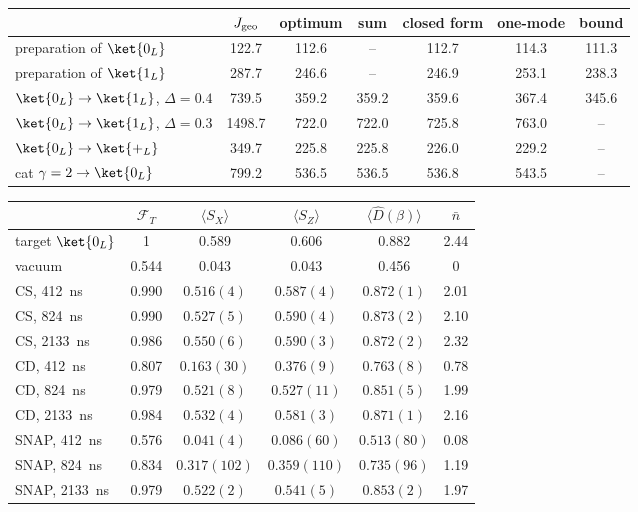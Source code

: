 \label{tab:vacuum}
\begin{ruledtabular}
\begin{tabular}{lcccccc}
 & $J_{\rm geo}$ & optimum & sum & closed form & one-mode & bound\\\hline
preparation of $\ket{0_L}$ & 122.7 & 112.6 & -- & 112.7 & 114.3 & 111.3\\
preparation of $\ket{1_L}$ & 287.7 & 246.6 & -- & 246.9 & 253.1 & 238.3\\
$\ket{0_L}\to\ket{1_L}$, $\Delta=0.4$ & 739.5 & 359.2 & 359.2 & 359.6 & 367.4 & 345.6\\
$\ket{0_L}\to\ket{1_L}$, $\Delta=0.3$ & 1498.7 & 722.0 & 722.0 & 725.8 & 763.0 & --\\
$\ket{0_L}\to\ket{+_L}$ & 349.7 & 225.8 & 225.8 & 226.0 & 229.2 & --\\
cat $\gamma=2\to\ket{0_L}$ & 799.2 & 536.5 & 536.5 & 536.8 & 543.5 & --\\
\end{tabular}

\label{tab:stab}
\begin{ruledtabular}
\begin{tabular}{lccccc}
 & $\mathcal F_T$ & $\langle S_X\rangle$ & $\langle S_Z\rangle$ & $\langle\hat D(\beta)\rangle$ & $\bar n$\\\hline
target $\ket{0_L}$ & 1 & 0.589 & 0.606 & 0.882 & 2.44\\
vacuum & 0.544 & 0.043 & 0.043 & 0.456 & 0\\\hline
CS, 412~ns & 0.990 & $0.516(4)$ & $0.587(4)$ & $0.872(1)$ & 2.01\\
CS, 824~ns & 0.990 & $0.527(5)$ & $0.590(4)$ & $0.873(2)$ & 2.10\\
CS, 2133~ns & 0.986 & $0.550(6)$ & $0.590(3)$ & $0.872(2)$ & 2.32\\
CD, 412~ns & 0.807 & $0.163(30)$ & $0.376(9)$ & $0.763(8)$ & 0.78\\
CD, 824~ns & 0.979 & $0.521(8)$ & $0.527(11)$ & $0.851(5)$ & 1.99\\
CD, 2133~ns & 0.984 & $0.532(4)$ & $0.581(3)$ & $0.871(1)$ & 2.16\\
SNAP, 412~ns & 0.576 & $0.041(4)$ & $0.086(60)$ & $0.513(80)$ & 0.08\\
SNAP, 824~ns & 0.834 & $0.317(102)$ & $0.359(110)$ & $0.735(96)$ & 1.19\\
SNAP, 2133~ns & 0.979 & $0.522(2)$ & $0.541(5)$ & $0.853(2)$ & 1.97\\
\end{tabular}


\end{ruledtabular}
\end{ruledtabular}
